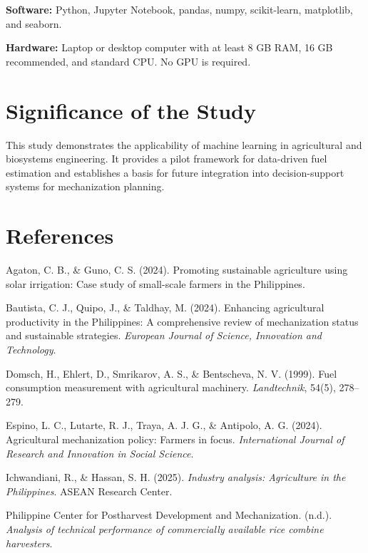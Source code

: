 \documentclass[11pt,twocolumn]{article}
\begin{document}
\textbf{Software:} Python, Jupyter Notebook, pandas, numpy, scikit-learn, matplotlib, and seaborn.

\vspace{10pt}

\textbf{Hardware:} Laptop or desktop computer with at least 8 GB RAM, 16 GB recommended, and standard CPU. No GPU is required.

\section*{Significance of the Study}

This study demonstrates the applicability of machine learning in agricultural and biosystems engineering. It provides a pilot framework for data-driven fuel estimation and establishes a basis for future integration into decision-support systems for mechanization planning.

\section*{References}

Agaton, C. B., \& Guno, C. S. (2024). Promoting sustainable agriculture using solar irrigation: Case study of small-scale farmers in the Philippines.

\vspace{10pt}

Bautista, C. J., Quipo, J., \& Taldhay, M. (2024). Enhancing agricultural productivity in the Philippines: A comprehensive review of mechanization status and sustainable strategies. \textit{European Journal of Science, Innovation and Technology}.

\vspace{10pt}

Domsch, H., Ehlert, D., Smrikarov, A. S., \& Bentscheva, N. V. (1999). Fuel consumption measurement with agricultural machinery. \textit{Landtechnik}, 54(5), 278--279.

\vspace{10pt}

Espino, L. C., Lutarte, R. J., Traya, A. J. G., \& Antipolo, A. G. (2024). Agricultural mechanization policy: Farmers in focus. \textit{International Journal of Research and Innovation in Social Science}.

\vspace{10pt}

Ichwandiani, R., \& Hassan, S. H. (2025). \textit{Industry analysis: Agriculture in the Philippines}. ASEAN Research Center.

\vspace{10pt}

Philippine Center for Postharvest Development and Mechanization. (n.d.). \textit{Analysis of technical performance of commercially available rice combine harvesters}.
\end{document}
